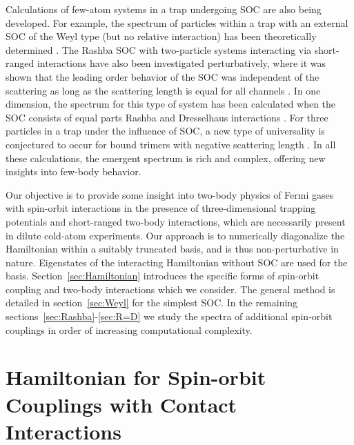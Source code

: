 \documentclass[%
 onecolumn,
 notitlepage,
 amsmath,amssymb,
 aps,
]{revtex4-1}
\begin{document}
Calculations of few-atom systems in a trap undergoing SOC are also being developed.  For example, the spectrum of particles within a trap with an external SOC of the Weyl type (but no relative interaction) has been theoretically determined \cite{anderson2013}. The Rashba SOC with two-particle systems interacting via short-ranged interactions have also been investigated perturbatively, where it was shown that the leading order behavior of the SOC was independent of the scattering as long as the scattering length is equal for all channels \cite{PhysRevA.89.033606}.  In one dimension, the spectrum for this type of system has been calculated when the SOC consists of equal parts Rashba and Dresselhaus interactions \cite{guan2014energy}.  For three particles in a trap under the influence of SOC, a new type of universality is conjectured to occur for bound trimers with negative scattering length \cite{PhysRevLett.112.013201}.  In all these calculations, the emergent spectrum is rich and complex, offering new insights into few-body behavior.

Our objective is to provide some insight into two-body physics of Fermi gases with spin-orbit interactions in the presence of three-dimensional trapping potentials and short-ranged two-body interactions, which are necessarily present in dilute cold-atom experiments. Our approach is to numerically diagonalize the Hamiltonian within a suitably truncated basis, and is thus non-perturbative in nature. Eigenstates of the interacting Hamiltonian without SOC are used for the basis. Section~\ref{sec:Hamiltonian} introduces the specific forms of spin-orbit coupling and two-body interactions which we consider. The general method is detailed in section~\ref{sec:Weyl} for the simplest SOC.  In the remaining sections~\ref{sec:Rashba}-\ref{sec:R=D} we study the spectra of additional spin-orbit couplings in order of increasing computational complexity.

\section{\label{sec:Hamiltonian}Hamiltonian for Spin-orbit Couplings with Contact Interactions}
\end{document}
